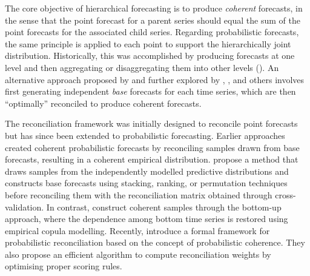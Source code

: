 \documentclass[a4paper,review,12pt,authoryear]{elsarticle}
\begin{document}
The core objective of hierarchical forecasting is to produce \textit{coherent} forecasts, 
in the sense that the point forecast for a parent series should equal the sum of the point forecasts for the associated child series. 
Regarding probabilistic forecasts, the same principle is applied to each point to support the hierarchically joint distribution.
Historically, this was accomplished by producing forecasts at one level 
and then aggregating or disaggregating them into other levels (\citealp{fliednerHierarchicalForecastingIssues2001}). 
An alternative approach proposed by \cite{hyndmanOptimalCombinationForecasts2011} and further explored by \cite{wickramasuriyaOptimalForecastReconciliation2019}, \cite{ anagiotelisForecastReconciliationGeometric2021}, and others involves 
first generating independent \textit{base} forecasts for each time series, 
which are then ``optimally'' reconciled to produce coherent forecasts.

The reconciliation framework was initially designed to reconcile point forecasts but has since been extended to probabilistic forecasting. 
Earlier approaches created coherent probabilistic forecasts by reconciling samples drawn from base forecasts, resulting in a coherent empirical distribution.
\cite{jeonProbabilisticForecastReconciliation2019} propose a method that draws samples from the independently modelled predictive distributions and constructs base forecasts using stacking, ranking, or permutation techniques before reconciling them with the reconciliation matrix obtained through cross-validation.
In contrast, \cite{bentaiebHierarchicalProbabilisticForecasting2020} construct coherent samples through the bottom-up approach, 
where the dependence among bottom time series is restored using empirical copula modelling.
Recently, \cite{panagiotelisProbabilisticForecastReconciliation2022} introduce a formal framework for probabilistic reconciliation based on the concept of probabilistic coherence. 
They also propose an efficient algorithm to compute reconciliation weights by optimising proper scoring rules. 
\end{document}
